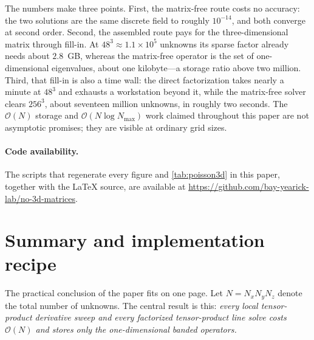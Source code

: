 \documentclass[11pt]{article}
\newcommand{\bigO}{\mathcal{O}}
\newcommand{\Nall}{N}
\begin{document}
The numbers make three points.  First, the matrix-free route costs no
accuracy: the two solutions are the same discrete field to roughly
$10^{-14}$, and both converge at second order.  Second, the assembled
route pays for the three-dimensional matrix through fill-in.  At
$48^3 \approx 1.1\times10^{5}$ unknowns its sparse factor already needs
about $2.8$~GB, whereas the matrix-free operator is the set of
one-dimensional eigenvalues, about one kilobyte---a storage ratio above
two million.  Third, that fill-in is also a time wall: the direct
factorization takes nearly a minute at $48^3$ and exhausts a workstation
beyond it, while the matrix-free solver clears $256^3$, about seventeen
million unknowns, in roughly two seconds.  The $\bigO(\Nall)$ storage and
$\bigO(\Nall\log N_{\max})$ work claimed throughout this paper are not
asymptotic promises; they are visible at ordinary grid sizes.

\paragraph{Code availability.}
The scripts that regenerate every figure and \cref{tab:poisson3d} in this
paper, together with the \LaTeX{} source, are available at
\url{https://github.com/bay-yearick-lab/no-3d-matrices}.


\section{Summary and implementation recipe}
\label{sec:summary}

The practical conclusion of the paper fits on one page.  Let
$\Nall = N_x N_y N_z$ denote the total number of unknowns.  The
central result is this:
\emph{every local tensor-product derivative sweep and every
factorized tensor-product line solve costs $\bigO(\Nall)$ and stores
only the one-dimensional banded operators.}
\end{document}
